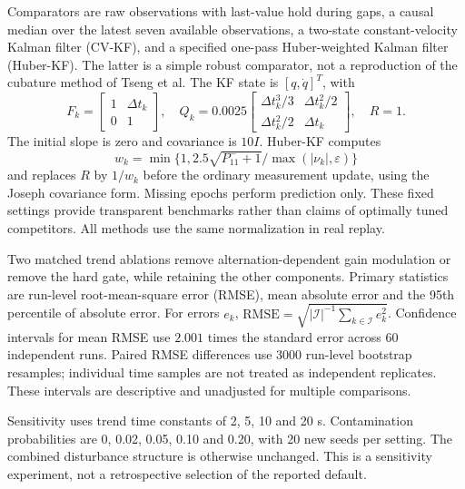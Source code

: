 \documentclass[12pt,a4paper]{article}
\begin{document}
Comparators are raw observations with last-value hold during gaps, a causal median over the latest seven available observations, a two-state constant-velocity Kalman filter (CV-KF), and a specified one-pass Huber-weighted Kalman filter (Huber-KF). The latter is a simple robust comparator, not a reproduction of the cubature method of Tseng et al. The KF state is $[q,\dot q]^T$, with
\begin{equation}
 F_k=\begin{bmatrix}1&\Delta t_k\\0&1\end{bmatrix},\quad
 Q_k=0.0025\begin{bmatrix}\Delta t_k^3/3&\Delta t_k^2/2\\
 \Delta t_k^2/2&\Delta t_k\end{bmatrix},\quad R=1.
 \label{eq:kf}
\end{equation}
The initial slope is zero and covariance is $10I$. Huber-KF computes
\begin{equation}
 w_k=\min\{1,2.5\sqrt{P^-_{11}+1}/\max(|\nu_k|,\varepsilon)\}
\end{equation}
and replaces $R$ by $1/w_k$ before the ordinary measurement update, using the Joseph covariance form. Missing epochs perform prediction only. These fixed settings provide transparent benchmarks rather than claims of optimally tuned competitors. All methods use the same normalization in real replay.

Two matched trend ablations remove alternation-dependent gain modulation or remove the hard gate, while retaining the other components. Primary statistics are run-level root-mean-square error (RMSE), mean absolute error and the 95th percentile of absolute error. For errors $e_k$, $\mathrm{RMSE}=\sqrt{|\mathcal I|^{-1}\sum_{k\in\mathcal I}e_k^2}$. Confidence intervals for mean RMSE use $2.001$ times the standard error across 60 independent runs. Paired RMSE differences use 3000 run-level bootstrap resamples; individual time samples are not treated as independent replicates. These intervals are descriptive and unadjusted for multiple comparisons.

Sensitivity uses trend time constants of 2, 5, 10 and 20 s. Contamination probabilities are 0, 0.02, 0.05, 0.10 and 0.20, with 20 new seeds per setting. The combined disturbance structure is otherwise unchanged. This is a sensitivity experiment, not a retrospective selection of the reported default.
\end{document}
